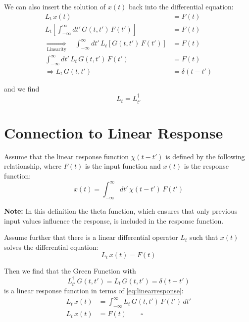 We can also insert the solution of $x(t)$ back into the differential equation:
\begin{align*}
    L_t\, x(t) &= F(t) \\
    L_t \left[ \int_{-\infty}^{\infty} dt'\, G(t,t')\, F(t') \right] &= F(t) \\
    \underset{\text{Linearity}}{\Rightarrow} \quad \int_{-\infty}^{\infty} dt'\, L_t \left[ G(t,t')\, F(t') \right] &= F(t) \\
    \int_{-\infty}^{\infty} dt'\, L_t\, G(t,t')\, F(t') &= F(t) \\
    \Rightarrow L_t\, G(t,t') &= \delta(t-t')
\end{align*}

and we find
\begin{equation}
    \boxed{L_t = L_{t'}^{\dagger}} \label{eq:diffopdagger}
\end{equation}

\section{Connection to Linear Response}

Assume that the linear response function $\chi(t-t')$ is defined by the following relationship,
where $F(t)$ is the input function and $x(t)$ is the response function:
\begin{equation}
    \boxed{x(t) = \int_{-\infty}^{\infty} dt'\, \chi(t-t')\, F(t')} \label{eq:linearresponse}
\end{equation}

\textbf{Note:} In this definition the theta function, which ensures that only previous input values influence the response, is included in the response function.

Assume further that there is a linear differential operator $L_t$ such that $x(t)$ solves the differential equation:
\begin{equation*}
    L_t\, x(t) = F(t)
\end{equation*}

Then we find that the Green Function with
\begin{equation*}
    L_{t'}^{\dagger}\, G(t,t') = L_t\, G(t,t') = \delta(t-t')
\end{equation*}
is a linear response function in terms of \ref{eq:linearresponse}:
\begin{align*}
    L_t\, x(t) &= \int_{-\infty}^{\infty} L_t\, G(t,t')\, F(t')\, dt' \\
    L_t\, x(t) &= F(t) \qquad \square
\end{align*}

